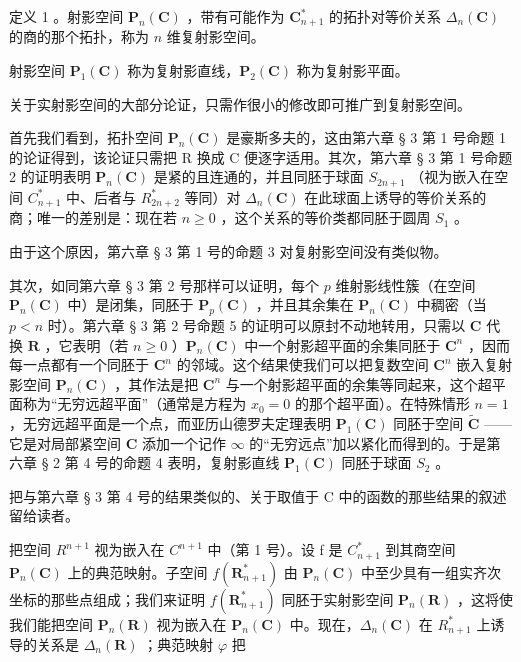 定义 1 。射影空间 \(\mathbf{P}_{n}(\mathbf{C})\) ，带有可能作为 \(\mathbf{C}_{n+1}^{*}\) 的拓扑对等价关系 \(\Delta_{n}(\mathbf{C})\) 的商的那个拓扑，称为 \(n\) 维复射影空间。

射影空间 \(\mathbf{P}_{1}(\mathbf{C})\) 称为复射影直线，\(\mathbf{P}_{2}(\mathbf{C})\) 称为复射影平面。

关于实射影空间的大部分论证，只需作很小的修改即可推广到复射影空间。

首先我们看到，拓扑空间 \(\mathbf{P}_{n}(\mathbf{C})\) 是豪斯多夫的，这由第六章 § 3 第 1 号命题 1 的论证得到，该论证只需把 R 换成 C 便逐字适用。其次，第六章 § 3 第 1 号命题 2 的证明表明 \(\mathbf{P}_{n}(\mathbf{C})\) 是紧的且连通的，并且同胚于球面 \(S_{2n+1}\) （视为嵌入在空间 \(C_{n+1}^{*}\) 中、后者与 \(R_{2n+2}^{*}\) 等同）对 \(\Delta_{n}(\mathbf{C})\) 在此球面上诱导的等价关系的商；唯一的差别是：现在若 \(n \geqslant 0\) ，这个关系的等价类都同胚于圆周 \(S_{1}\) 。

由于这个原因，第六章 § 3 第 1 号的命题 3 对复射影空间没有类似物。

其次，如同第六章 § 3 第 2 号那样可以证明，每个 \(p\) 维射影线性簇（在空间 \(\mathbf{P}_n(\mathbf{C})\) 中）是闭集，同胚于 \(\mathbf{P}_p(\mathbf{C})\) ，并且其余集在 \(\mathbf{P}_n(\mathbf{C})\) 中稠密（当 \(p < n\) 时）。第六章 § 3 第 2 号命题 5 的证明可以原封不动地转用，只需以 \(\mathbf{C}\) 代换 \(\mathbf{R}\) ，它表明（若 \(n \geqslant 0\) ）\(\mathbf{P}_n(\mathbf{C})\) 中一个射影超平面的余集同胚于 \(\mathbf{C}^n\) ，因而每一点都有一个同胚于 \(\mathbf{C}^n\) 的邻域。这个结果使我们可以把复数空间 \(\mathbf{C}^n\) 嵌入复射影空间 \(\mathbf{P}_n(\mathbf{C})\) ，其作法是把 \(\mathbf{C}^n\) 与一个射影超平面的余集等同起来，这个超平面称为“无穷远超平面”（通常是方程为 \(x_0 = 0\) 的那个超平面）。在特殊情形 \(n = 1\) ，无穷远超平面是一个点，而亚历山德罗夫定理表明 \(\mathbf{P}_1(\mathbf{C})\) 同胚于空间 \(\tilde{\mathbf{C}}\) ——它是对局部紧空间 \(\mathbf{C}\) 添加一个记作 \(\infty\) 的“无穷远点”加以紧化而得到的。于是第六章 § 2 第 4 号的命题 4 表明，复射影直线 \(\mathbf{P}_1(\mathbf{C})\) 同胚于球面 \(S_2\) 。

把与第六章 § 3 第 4 号的结果类似的、关于取值于 C 中的函数的那些结果的叙述留给读者。

把空间 \(R^{n+1}\) 视为嵌入在 \(C^{n+1}\) 中（第 1 号）。设 f 是 \(C_{n+1}^{*}\) 到其商空间 \(\mathbf{P}_{n}(\mathbf{C})\) 上的典范映射。子空间 \(f(\mathbf{R}_{n+1}^{*})\) 由 \(\mathbf{P}_{n}(\mathbf{C})\) 中至少具有一组实齐次坐标的那些点组成；我们来证明 \(f(\mathbf{R}_{n+1}^{*})\) 同胚于实射影空间 \(\mathbf{P}_{n}(\mathbf{R})\) ，这将使我们能把空间 \(\mathbf{P}_{n}(\mathbf{R})\) 视为嵌入在 \(\mathbf{P}_{n}(\mathbf{C})\) 中。现在，\(\Delta_{n}(\mathbf{C})\) 在 \(R_{n+1}^{*}\) 上诱导的关系是 \(\Delta_{n}(\mathbf{R})\) ；典范映射 \(\varphi\) 把

